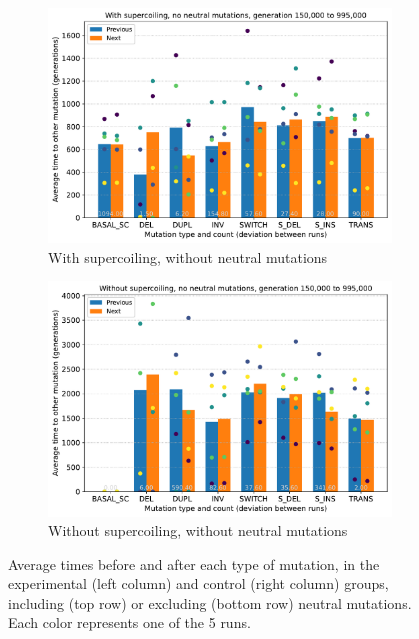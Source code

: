 \begin{figure}[h!]
  \begin{subfigure}[b]{0.49\textwidth}
    \includegraphics[width=\textwidth]{aevol/images/with_sc_mut_time_no_neutral_150k_995k.pdf}
    \caption{With supercoiling, without neutral mutations}
    \label{subfig:sc_no_neut}
  \end{subfigure}
  \begin{subfigure}[b]{0.49\textwidth}
    \includegraphics[width=\textwidth]{aevol/images/without_sc_mut_time_no_neutral_150k_995k.pdf}
    \caption{Without supercoiling, without neutral mutations}
    \label{subfig:no_sc_no_neut}
  \end{subfigure}

  \caption{Average times before and after each type of mutation, in the experimental (left column) and control (right column) groups, including (top row) or excluding (bottom row) neutral mutations. Each color represents one of the 5 runs.}
  \label{fig:mut_times}
\end{figure}

